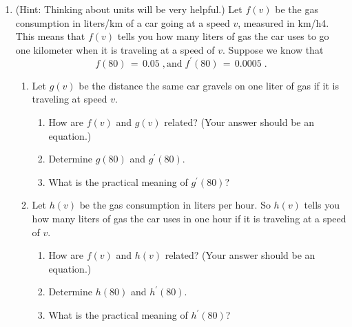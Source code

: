 \documentclass[12pt]{article}
\begin{document}
\begin{enumerate}
\item (Hint: Thinking about units will be very helpful.) Let $f(v)$ be
  the gas consumption in liters/km of a car going at 
  a speed $v$, measured in km/h4.  This means that $f(v)$ tells you
  how many liters of gas the car uses to go one kilometer when it is
  traveling at a speed of $v$.  Suppose we know that
  \begin{equation}
    f(80) \, = \,  0.05 \;, \text{and} \; f^\prime(80) \, = \,
    0.0005 \;.
  \end{equation}
  \begin{enumerate}
    \setlength{\itemsep}{8mm}
  \item Let $g(v)$ be the distance the same car gravels on one liter
    of gas if it is traveling at speed $v$.
    \begin{enumerate}
          \setlength{\itemsep}{4mm}
    \item How are $f(v)$ and $g(v)$ related?  (Your answer should
      be an equation.)
    \item Determine $g(80)$ and $g^\prime(80)$.
    \item What is the practical meaning of $g^\prime(80)$? 
    \end{enumerate}
  \item Let $h(v)$ be the gas consumption in liters per hour.  So
    $h(v)$ tells you how many liters of gas the car uses 
    in one hour if it is traveling at a speed of $v$.  
    \begin{enumerate}
      \setlength{\itemsep}{4mm}
    \item How are $f(v)$ and $h(v)$ related?  (Your answer should
      be an equation.)
    \item Determine $h(80)$ and $h^\prime(80)$.
    \item What is the practical meaning of $h^\prime(80)$? 
    \end{enumerate}  
  \end{enumerate}
  

  
  
\end{enumerate}
\end{document}
